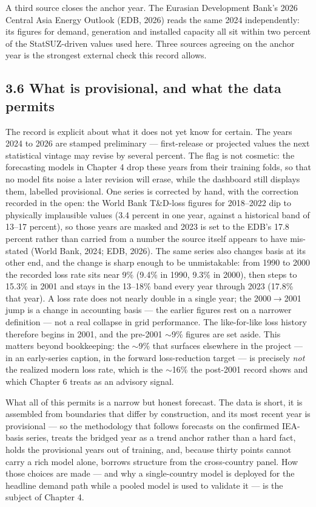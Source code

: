 \documentclass[10pt,twocolumn]{article}
\begin{document}
A third source closes the anchor year. The Eurasian Development Bank's 2026 Central Asia Energy Outlook (EDB, 2026) reads the same 2024 independently: its figures for demand, generation and installed capacity all sit within two percent of the StatSUZ-driven values used here. Three sources agreeing on the anchor year is the strongest external check this record allows.

\subsection*{3.6 What is provisional, and what the data permits}

The record is explicit about what it does not yet know for certain. The years 2024 to 2026 are stamped preliminary --- first-release or projected values the next statistical vintage may revise by several percent. The flag is not cosmetic: the forecasting models in Chapter 4 drop these years from their training folds, so that no model fits noise a later revision will erase, while the dashboard still displays them, labelled provisional. One series is corrected by hand, with the correction recorded in the open: the World Bank T\&D-loss figures for 2018--2022 dip to physically implausible values (3.4 percent in one year, against a historical band of 13--17 percent), so those years are masked and 2023 is set to the EDB's 17.8 percent rather than carried from a number the source itself appears to have mis-stated (World Bank, 2024; EDB, 2026). The same series also changes basis at its other end, and the change is sharp enough to be unmistakable: from 1990 to 2000 the recorded loss rate sits near 9\% (9.4\% in 1990, 9.3\% in 2000), then steps to 15.3\% in 2001 and stays in the 13--18\% band every year through 2023 (17.8\% that year). A loss rate does not nearly double in a single year; the 2000$\rightarrow$2001 jump is a change in accounting basis --- the earlier figures rest on a narrower definition --- not a real collapse in grid performance. The like-for-like loss history therefore begins in 2001, and the pre-2001 $\sim$9\% figures are set aside. This matters beyond bookkeeping: the $\sim$9\% that surfaces elsewhere in the project --- in an early-series caption, in the forward loss-reduction target --- is precisely \textit{not} the realized modern loss rate, which is the $\sim$16\% the post-2001 record shows and which Chapter 6 treats as an advisory signal.

What all of this permits is a narrow but honest forecast. The data is short, it is assembled from boundaries that differ by construction, and its most recent year is provisional --- so the methodology that follows forecasts on the confirmed IEA-basis series, treats the bridged year as a trend anchor rather than a hard fact, holds the provisional years out of training, and, because thirty points cannot carry a rich model alone, borrows structure from the cross-country panel. How those choices are made --- and why a single-country model is deployed for the headline demand path while a pooled model is used to validate it --- is the subject of Chapter 4.
\end{document}
